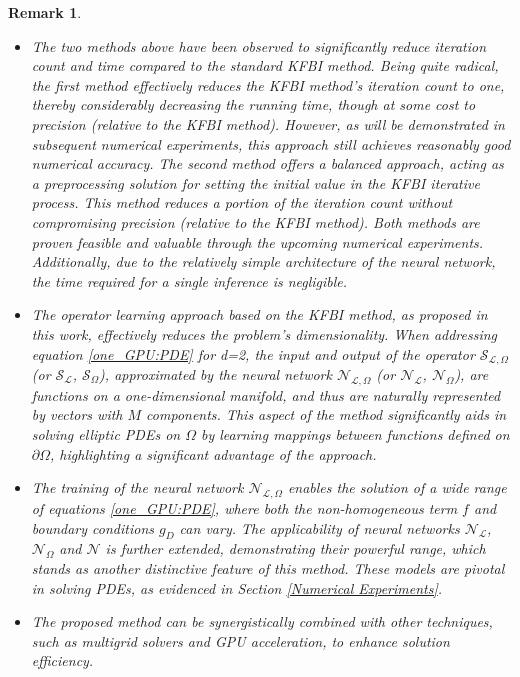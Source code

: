 \documentclass{article}
\newtheorem{remark}{Remark}
\begin{document}
\begin{remark}
\begin{itemize}
\item The two methods above have been observed to significantly reduce iteration count and time compared to the standard KFBI method. Being quite radical, the first method effectively reduces the KFBI method's iteration count to one, thereby considerably decreasing the running time, though at some cost to precision (relative to the KFBI method). However, as will be demonstrated in subsequent numerical experiments, this approach still achieves reasonably good numerical accuracy. The second method offers a balanced approach, acting as a preprocessing solution for setting the initial value in the KFBI iterative process. This method reduces a portion of the iteration count without compromising precision (relative to the KFBI method). Both methods are proven feasible and valuable through the upcoming numerical experiments. Additionally, due to the relatively simple architecture of the neural network, the time required for a single inference is negligible.
\item The operator learning approach based on the KFBI method, as proposed in this work, effectively reduces the problem's dimensionality. When addressing equation \eqref{one_GPU:PDE} for d=2, the input and output of the operator $\mathcal{S}_{\mathcal{L}, \Omega}$ (or $\mathcal{S}_{\mathcal{L}}$, $\mathcal{S}_{\Omega}$), approximated by the neural network $\mathcal{N}_{\mathcal{L}, \Omega}$ (or $\mathcal{N}_{\mathcal{L}}$, $\mathcal{N}_{\Omega}$), are functions on a one-dimensional manifold, and thus are naturally represented by vectors with $M$ components. This aspect of the method significantly aids in solving elliptic PDEs on $\Omega$ by learning mappings between functions defined on \(\partial \Omega\), highlighting a significant advantage of the approach.

\item The training of the neural network $\mathcal{N}_{\mathcal{L}, \Omega}$ enables the solution of a wide range of equations \eqref{one_GPU:PDE}, where both the non-homogeneous term $f$ and boundary conditions $g_D$ can vary. The applicability of neural networks $\mathcal{N}_{\mathcal{L}}$, $\mathcal{N}_{\Omega}$ and $\mathcal{N}$ is further extended, demonstrating their powerful range, which stands as another distinctive feature of this method. These models are pivotal in solving PDEs, as evidenced in Section \ref{Numerical Experiments}.

\item The proposed method can be synergistically combined with other techniques, such as multigrid solvers and GPU acceleration, to enhance solution efficiency.
\end{itemize}
\end{remark}
\end{document}
